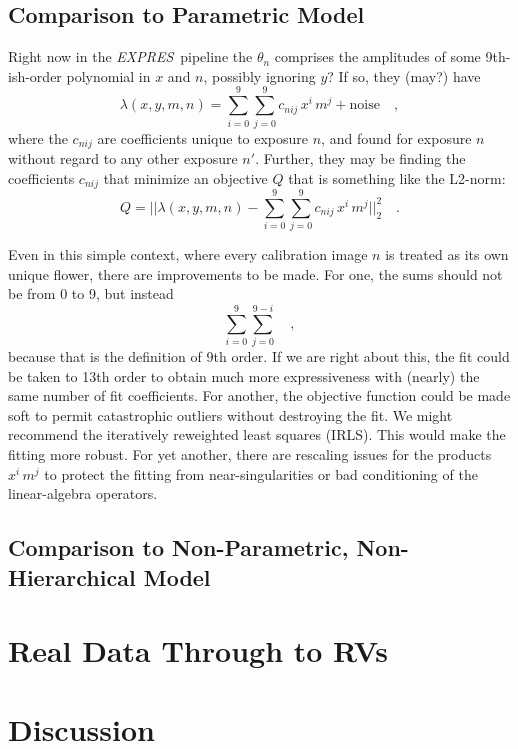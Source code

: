 \documentclass[12pt, letterpaper]{article}
\newcommand{\project}[1]{\textsl{#1}}
\newcommand{\acronym}[1]{{\small{#1}}}
\newcommand{\expres}{\project{\acronym{EXPRES}}}
\begin{document}
\subsection{Comparison to Parametric Model}
Right now in the \expres\ pipeline the $\theta_{n}$ comprises the
amplitudes of some 9th-ish-order polynomial in $x$ and $n$, possibly
ignoring $y$?
If so, they (may?) have
\begin{equation}
\lambda(x,y,m,n) = \sum_{i=0}^9\sum_{j=0}^9 c_{nij}\, x^i\,m^j + \mathrm{noise}
\quad ,
\end{equation}
where the $c_{nij}$ are coefficients unique to exposure $n$, and
found for exposure $n$ without regard to any other exposure $n'$.
Further, they may be finding the coefficients $c_{nij}$ that
minimize an objective $Q$ that is something like the L2-norm:
\begin{equation}
Q = ||\lambda(x,y,m,n) - \sum_{i=0}^9\sum_{j=0}^9 c_{nij}\, x^i\,m^j||_2^2
\quad .
\end{equation}

Even in this simple context, where every calibration image $n$ is
treated as its own unique flower, there are improvements to be
made.
For one, the sums should not be from 0 to 9, but instead
\begin{equation}
\sum_{i=0}^9\sum_{j=0}^{9-i}
\quad ,
\end{equation}
because that is the definition of 9th order.
If we are right about this, the fit could be taken to 13th order to obtain
much more expressiveness with (nearly) the same number of fit coefficients.
For another, the objective function could be made soft to permit
catastrophic outliers without destroying the fit.
We might recommend the iteratively reweighted least squares (IRLS).
This would make the fitting more robust.
For yet another, there are rescaling issues for the products $x^i\,m^j$ to
protect the fitting from near-singularities or bad conditioning of the
linear-algebra operators.

\subsection{Comparison to Non-Parametric, Non-Hierarchical Model}


\section{Real Data Through to RVs}

\section{Discussion} \label{sec:discussion}
\end{document}

